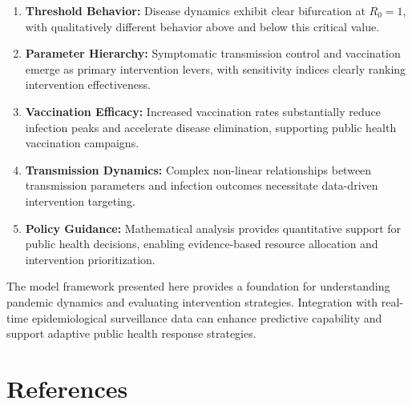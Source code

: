 \documentclass[12pt,a4paper]{report}
\begin{document}
\begin{enumerate}
    \item \textbf{Threshold Behavior:} Disease dynamics exhibit clear bifurcation at $R_0 = 1$, with qualitatively different behavior above and below this critical value.
    
    \item \textbf{Parameter Hierarchy:} Symptomatic transmission control and vaccination emerge as primary intervention levers, with sensitivity indices clearly ranking intervention effectiveness.
    
    \item \textbf{Vaccination Efficacy:} Increased vaccination rates substantially reduce infection peaks and accelerate disease elimination, supporting public health vaccination campaigns.
    
    \item \textbf{Transmission Dynamics:} Complex non-linear relationships between transmission parameters and infection outcomes necessitate data-driven intervention targeting.
    
    \item \textbf{Policy Guidance:} Mathematical analysis provides quantitative support for public health decisions, enabling evidence-based resource allocation and intervention prioritization.
\end{enumerate}

The model framework presented here provides a foundation for understanding pandemic dynamics and evaluating intervention strategies. Integration with real-time epidemiological surveillance data can enhance predictive capability and support adaptive public health response strategies.

\chapter{References}
\end{document}
